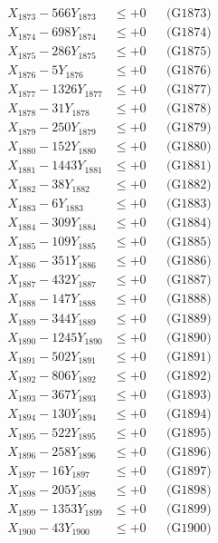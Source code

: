 \documentclass[a4paper,10pt]{article}
\begin{document}
{\begin{align}
X_{1873} - 566Y_{1873} &\leq +0 && \text{(G1873)} \\
X_{1874} - 698Y_{1874} &\leq +0 && \text{(G1874)} \\
X_{1875} - 286Y_{1875} &\leq +0 && \text{(G1875)} \\
X_{1876} - 5Y_{1876} &\leq +0 && \text{(G1876)} \\
X_{1877} - 1326Y_{1877} &\leq +0 && \text{(G1877)} \\
X_{1878} - 31Y_{1878} &\leq +0 && \text{(G1878)} \\
X_{1879} - 250Y_{1879} &\leq +0 && \text{(G1879)} \\
X_{1880} - 152Y_{1880} &\leq +0 && \text{(G1880)} \\
\allowbreak
X_{1881} - 1443Y_{1881} &\leq +0 && \text{(G1881)} \\
X_{1882} - 38Y_{1882} &\leq +0 && \text{(G1882)} \\
X_{1883} - 6Y_{1883} &\leq +0 && \text{(G1883)} \\
X_{1884} - 309Y_{1884} &\leq +0 && \text{(G1884)} \\
X_{1885} - 109Y_{1885} &\leq +0 && \text{(G1885)} \\
X_{1886} - 351Y_{1886} &\leq +0 && \text{(G1886)} \\
X_{1887} - 432Y_{1887} &\leq +0 && \text{(G1887)} \\
X_{1888} - 147Y_{1888} &\leq +0 && \text{(G1888)} \\
X_{1889} - 344Y_{1889} &\leq +0 && \text{(G1889)} \\
X_{1890} - 1245Y_{1890} &\leq +0 && \text{(G1890)} \\
\allowbreak
X_{1891} - 502Y_{1891} &\leq +0 && \text{(G1891)} \\
X_{1892} - 806Y_{1892} &\leq +0 && \text{(G1892)} \\
X_{1893} - 367Y_{1893} &\leq +0 && \text{(G1893)} \\
X_{1894} - 130Y_{1894} &\leq +0 && \text{(G1894)} \\
X_{1895} - 522Y_{1895} &\leq +0 && \text{(G1895)} \\
X_{1896} - 258Y_{1896} &\leq +0 && \text{(G1896)} \\
X_{1897} - 16Y_{1897} &\leq +0 && \text{(G1897)} \\
X_{1898} - 205Y_{1898} &\leq +0 && \text{(G1898)} \\
X_{1899} - 1353Y_{1899} &\leq +0 && \text{(G1899)} \\
X_{1900} - 43Y_{1900} &\leq +0 && \text{(G1900)} \\

\end{align}}
\end{document}
